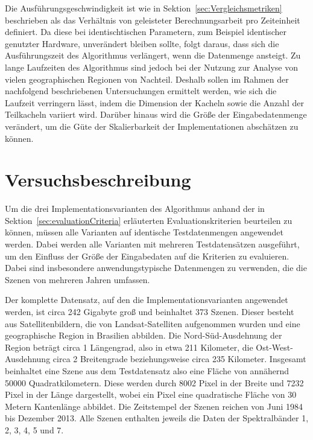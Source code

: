Die Ausführungsgeschwindigkeit ist wie in Sektion~\ref{sec:Vergleichsmetriken} beschrieben als das Verhältnis von geleisteter Berechnungsarbeit pro Zeiteinheit definiert. Da diese bei identischtischen Parametern, zum Beispiel identischer genutzter Hardware, unverändert bleiben sollte, folgt daraus, dass sich die Ausführungszeit des Algorithmus verlängert, wenn die Datenmenge ansteigt. Zu lange Laufzeiten des Algorithmus sind jedoch bei der Nutzung zur Analyse von vielen geographischen Regionen von Nachteil. Deshalb sollen im Rahmen der nachfolgend beschriebenen Untersuchungen ermittelt werden, wie sich die Laufzeit verringern lässt, indem die Dimension der Kacheln sowie die Anzahl der Teilkacheln variiert wird. Darüber hinaus wird die Größe der Eingabedatenmenge verändert, um die Güte der Skalierbarkeit der Implementationen abschätzen zu können.

\section{Versuchsbeschreibung}
Um die drei Implementationsvarianten des Algorithmus anhand der in Sektion~\ref{sec:evaluationCriteria} erläuterten Evaluationskriterien beurteilen zu können, müssen alle Varianten auf identische Testdatenmengen angewendet werden. Dabei werden alle Varianten mit mehreren Testdatensätzen ausgeführt, um den Einfluss der Größe der Eingabedaten auf die Kriterien zu evaluieren. Dabei sind insbesondere anwendungstypische Datenmengen zu verwenden, die die Szenen von mehreren Jahren umfassen. 

Der komplette Datensatz, auf den die Implementationsvarianten angewendet werden, ist circa 242 Gigabyte groß und beinhaltet 373 Szenen. Dieser besteht aus Satellitenbildern, die von Landsat-Satelliten aufgenommen wurden und eine geographische Region in Brasilien abbilden. Die Nord-Süd-Ausdehnung der Region beträgt circa 1 Längengrad, also in etwa 211 Kilometer, die Ost-West-Ausdehnung circa 2 Breitengrade beziehungsweise circa 235 Kilometer. Insgesamt beinhaltet eine Szene aus dem Testdatensatz also eine Fläche von annähernd 50000 Quadratkilometern. Diese werden durch 8002 Pixel in der Breite und 7232 Pixel in der Länge dargestellt, wobei ein Pixel eine quadratische Fläche von 30 Metern Kantenlänge abbildet. Die Zeitstempel der Szenen reichen von Juni 1984 bis Dezember 2013. Alle Szenen enthalten jeweils die Daten der Spektralbänder 1, 2, 3, 4, 5 und 7. 



